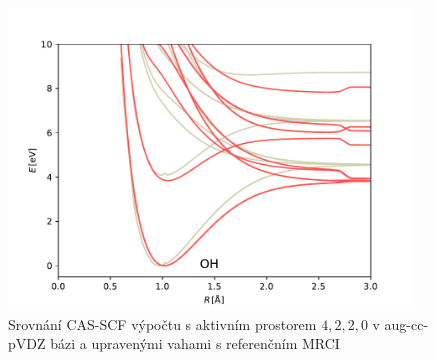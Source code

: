 \begin{figure}
\centering
\includegraphics[width=0.95\textwidth]{../img/OH-MULTI-DZ-4220-w1.pdf}
\caption{Srovnání CAS-SCF výpočtu s aktivním prostorem $4,2,2,0$ v aug-cc-pVDZ bázi a  
upravenými vahami s referenčním MRCI}
\label{gr_OH_4220_w}
\end{figure}


